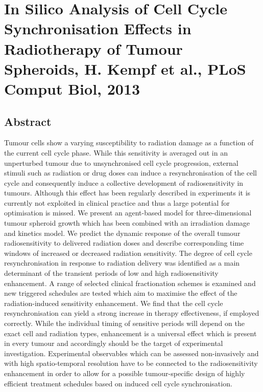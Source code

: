 \documentclass[11pt,a4paper]{article}
\begin{document}
\section*{In Silico Analysis of Cell Cycle Synchronisation Effects in Radiotherapy of Tumour Spheroids, H. Kempf et al., PLoS Comput Biol, 2013}
\subsection*{Abstract}
Tumour cells show a varying susceptibility to radiation damage as a function of the current cell cycle phase. While this sensitivity is averaged out in an unperturbed tumour due to unsynchronised cell cycle progression, external stimuli such as radiation or drug doses can induce a resynchronisation of the cell cycle and consequently induce a collective development of radiosensitivity in tumours. Although this effect has been regularly described in experiments it is currently not exploited in clinical practice and thus a large potential for optimisation is missed. We present an agent-based model for three-dimensional tumour spheroid growth which has been combined with an irradiation damage and kinetics model. We predict the dynamic response of the overall tumour radiosensitivity to delivered radiation doses and describe corresponding time windows of increased or decreased radiation sensitivity. The degree of cell cycle resynchronisation in response to radiation delivery was identified as a main determinant of the transient periods of low and high radiosensitivity enhancement. A range of selected clinical fractionation schemes is examined and new triggered schedules are tested which aim to maximise the effect of the radiation-induced sensitivity enhancement. We find that the cell cycle resynchronisation can yield a strong increase in therapy effectiveness, if employed correctly. While the individual timing of sensitive periods will depend on the exact cell and radiation types, enhancement is a universal effect which is present in every tumour and accordingly should be the target of experimental investigation. Experimental observables which can be assessed non-invasively and with high spatio-temporal resolution have to be connected to the radiosensitivity enhancement in order to allow for a possible tumour-specific design of highly efficient treatment schedules based on induced cell cycle synchronisation.
\end{document}
